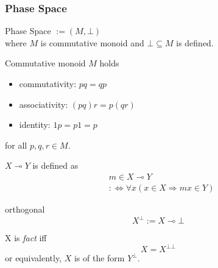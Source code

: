 \documentclass[dvipdfmx,cjk]{beamer}
\theoremstyle{example}
\begin{document}
\begin{frame}
  \frametitle{Phase Space}

  \begin{definition}{Phase Space $ := (M, \bot) $} \\
    where $M$ is commutative monoid and $\bot \subseteq M$ is defined.
  \end{definition}

  \begin{definition}{Commutative monoid $M$} holds \\
    \begin{itemize}
      \item commutativity: $pq = qp$
      \item associativity: $(pq)r = p(qr)$
      \item identity: $1p = p1 = p$
    \end{itemize}
    for all $p, q, r \in M$.
  \end{definition}
  
\end{frame}

\begin{frame}
  
  \begin{definition}{$X \multimap Y$}
    is defined as 
    \begin{align*}
      & m \in X \multimap Y \\
      & :\Leftrightarrow \forall x (x \in X \Rightarrow mx \in Y)
    \end{align*}
  \end{definition}

  \begin{definition}{orthogonal}
    \[
      X^\bot := X \multimap \bot
    \]
  \end{definition}

  \begin{definition}{X is \textit{fact}} iff
    \[
     X = X^{\bot\bot}
    \]
    or equivalently, $X$ is of the form $Y^\bot$.
  \end{definition}
\end{frame}
\end{document}
